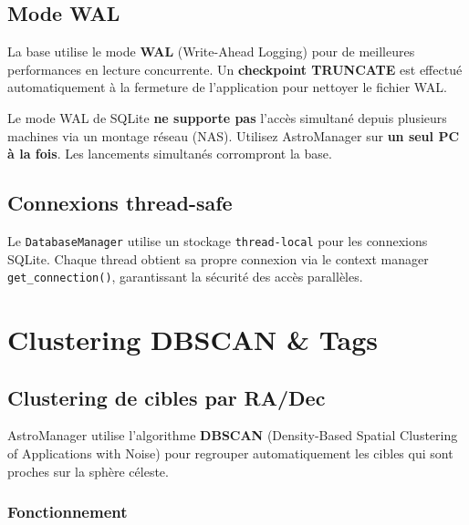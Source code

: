 \documentclass[a4paper,11pt]{article}
\begin{document}
\subsection{Mode WAL}

La base utilise le mode \textbf{WAL} (Write-Ahead Logging) pour de meilleures performances en lecture concurrente. Un \textbf{checkpoint TRUNCATE} est effectu\'{e} automatiquement \`{a} la fermeture de l'application pour nettoyer le fichier WAL.

\begin{criticalbox}
Le mode WAL de SQLite \textbf{ne supporte pas} l'acc\`{e}s simultan\'{e} depuis plusieurs machines via un montage r\'{e}seau (NAS). Utilisez AstroManager sur \textbf{un seul PC \`{a} la fois}. Les lancements simultan\'{e}s corrompront la base.
\end{criticalbox}

\subsection{Connexions thread-safe}

Le \texttt{DatabaseManager} utilise un stockage \texttt{thread-local} pour les connexions SQLite. Chaque thread obtient sa propre connexion via le context manager \texttt{get\_connection()}, garantissant la s\'{e}curit\'{e} des acc\`{e}s parall\`{e}les.


\section{Clustering DBSCAN \& Tags}
\label{sec:clustering}

\subsection{Clustering de cibles par RA/Dec}

AstroManager utilise l'algorithme \textbf{DBSCAN} (Density-Based Spatial Clustering of Applications with Noise) pour regrouper automatiquement les cibles qui sont proches sur la sph\`{e}re c\'{e}leste.

\subsubsection{Fonctionnement}
\end{document}
